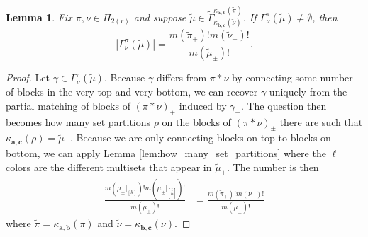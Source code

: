 \documentclass[10pt]{amsart}
\theoremstyle{definition}
\theoremstyle{definition}
\theoremstyle{plain}
\newtheorem{lemma}[lemma]{Lemma}
\theoremstyle{remark}
\theoremstyle{plain}
\theoremstyle{plain}
\newcommand{\bfa}{{\boldsymbol{a}}}
\newcommand{\bfb}{{\boldsymbol{b}}}
\newcommand{\bfc}{{\boldsymbol{c}}}
\newcommand{\tpi}{{\tilde{\pi}}}
\newcommand{\tmu}{{\tilde{\mu}}}
\newcommand{\tnu}{{\tilde{\nu}}}
\newcommand{\ovov}[1]{\bar{\bar{#1}}}
\newcommand{\ovovb}[1]{\left[\ovov{#1}\right]}
\newcommand{\abs}[1]{\left| #1\right |}
\begin{document}
\begin{lemma}\label{lem:size_of_gamma} Fix $\pi,\nu\in \Pi_{2(r)}$ and suppose $\tmu\in\tilde{\Gamma}^{\kappa_{\bfa,\bfb}(\tpi)}_{\kappa_{\bfb,\bfc}(\tnu)}$. If $\Gamma_\nu^\pi(\tmu)\neq\emptyset$, then \[\abs{\Gamma^\pi_\nu(\tmu)}=\frac{m(\tpi_+)!m(\tnu_-)!}{m(\tmu_\pm)!}.\]
\end{lemma}

\begin{proof} Let $\gamma\in\Gamma_\nu^\pi(\tmu)$. Because $\gamma$ differs from $\pi\ast\nu$ by connecting some number of blocks in the very top and very bottom, we can recover $\gamma$ uniquely from the partial matching of blocks of $(\pi\ast\nu)_\pm$ induced by $\gamma_\pm$. The question then becomes how many set partitions $\rho$ on the blocks of $(\pi\ast\nu)_\pm$ there are such that $\kappa_{\bfa,\bfc}(\rho)=\tmu_\pm$. Because we are only connecting blocks on top to blocks on bottom, we can apply Lemma \ref{lem:how_many_set_partitions} where the $\ell$ colors are the different multisets that appear in $\tmu_\pm$. The number is then \begin{align*}
    \frac{m(\tmu_\pm|_{[k]})!m(\tmu_\pm|_{\ovovb{k}})!}{m(\tmu_\pm)!}&=\frac{m(\tpi_+)!m(\nu_-)!}{m(\tmu_\pm)!}
\end{align*} where $\tpi=\kappa_{\bfa,\bfb}(\pi)$ and $\tnu=\kappa_{\bfb,\bfc}(\nu)$.
\end{proof}

\end{document}
